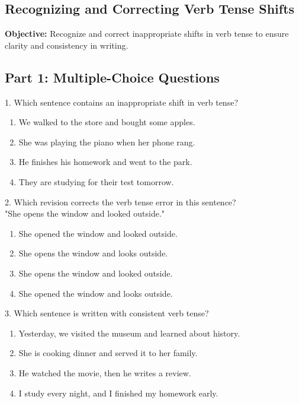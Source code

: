 \documentclass[12pt]{article}
\begin{document}
\subsection*{Recognizing and Correcting Verb Tense Shifts}
\onehalfspacing

\begin{tcolorbox}[colframe=black!40, colback=gray!0, title=Learning Objective]
\textbf{Objective:} Recognize and correct inappropriate shifts in verb tense to ensure clarity and consistency in writing.
\end{tcolorbox}

\subsection*{Part 1: Multiple-Choice Questions}

1. Which sentence contains an inappropriate shift in verb tense?  
\begin{enumerate}[label=\Alph*.]
    \item We walked to the store and bought some apples.  
    \item She was playing the piano when her phone rang.  
    \item He finishes his homework and went to the park.  
    \item They are studying for their test tomorrow.  
\end{enumerate}

\vspace{1cm}

2. Which revision corrects the verb tense error in this sentence?  
\\"She opens the window and looked outside."  
\begin{enumerate}[label=\Alph*.]
    \item She opened the window and looked outside.  
    \item She opens the window and looks outside.  
    \item She opens the window and looked outside.  
    \item She opened the window and looks outside.  
\end{enumerate}

\vspace{1cm}

3. Which sentence is written with consistent verb tense?  
\begin{enumerate}[label=\Alph*.]
    \item Yesterday, we visited the museum and learned about history.  
    \item She is cooking dinner and served it to her family.  
    \item He watched the movie, then he writes a review.  
    \item I study every night, and I finished my homework early.  
\end{enumerate}
\end{document}
